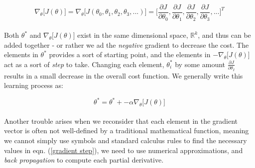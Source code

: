 \documentclass[12pt,letterpaper]{article}
\begin{document}
\begin{equation}
\label{cost gradient}
\nabla_\theta \big[ J(\theta) \big] = \nabla_\theta \big[ J(\theta_0, \theta_1,\theta_2,\theta_3,...) \big] =
\Big[ \frac{\partial J}{\partial \theta_0}, \frac{\partial J}{\partial \theta_1}, 
		\frac{\partial J}{\partial \theta_2}, \frac{\partial J}{\partial \theta_3}, ... \Big]^T
\end{equation}

\paragraph*{}Both $\theta^*$ and $\nabla_\theta \big[ J(\theta) \big]$ exist in the same dimensional space, $\mathbb{R}^k$, and thus can be added together - or rather we ad the \textit{negative} gradient to decrease the cost. The elements in $\theta^*$ provides a sort of starting point, and the elements in $-\nabla_\theta \big[ J(\theta) \big]$ act as a sort of \textit{step} to take. Changing each element, $\theta^*_i$ by some amount $\frac{\partial J}{\partial \theta_I}$ results in a small decrease in the overall cost function. We generally write this learning process as:

\begin{equation}
\label{gradient step}
\theta^* = \theta^* + -\alpha \nabla_\theta \big[ J(\theta) \big]
\end{equation}

\paragraph*{}Another trouble arises when we reconsider that each element in the gradient vector is often not well-defined by a traditional mathematical function, meaning we cannot simply use symbols and standard calculus rules to find the necessary values in eqn. (\ref{gradient step}), we need to use numerical approximations, and \textit{back propagation} to compute each partial derivative. 














\end{document}
